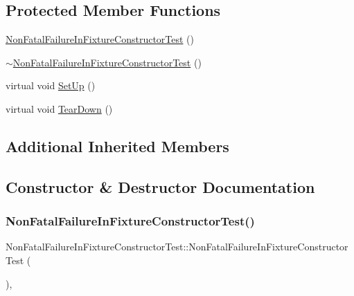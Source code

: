 \subsection*{Protected Member Functions}
\begin{DoxyCompactItemize}
\item 
\hyperlink{class_non_fatal_failure_in_fixture_constructor_test_a87a70e2b18b981c627c43f2af85a9345}{Non\+Fatal\+Failure\+In\+Fixture\+Constructor\+Test} ()
\item 
\hyperlink{class_non_fatal_failure_in_fixture_constructor_test_a732fa961c4bb68b3390e4a49a8375619}{$\sim$\+Non\+Fatal\+Failure\+In\+Fixture\+Constructor\+Test} ()
\item 
virtual void \hyperlink{class_non_fatal_failure_in_fixture_constructor_test_a7d951f8fbf7b2ac5046be8d8ee7b03d3}{Set\+Up} ()
\item 
virtual void \hyperlink{class_non_fatal_failure_in_fixture_constructor_test_ab76d79c346d9a378d625fde5739e8ad6}{Tear\+Down} ()
\end{DoxyCompactItemize}
\subsection*{Additional Inherited Members}


\subsection{Constructor \& Destructor Documentation}
\mbox{\label{class_non_fatal_failure_in_fixture_constructor_test_a87a70e2b18b981c627c43f2af85a9345}} 
\subsubsection{\texorpdfstring{Non\+Fatal\+Failure\+In\+Fixture\+Constructor\+Test()}{NonFatalFailureInFixtureConstructorTest()}}
{\footnotesize\ttfamily Non\+Fatal\+Failure\+In\+Fixture\+Constructor\+Test\+::\+Non\+Fatal\+Failure\+In\+Fixture\+Constructor\+Test (\begin{DoxyParamCaption}{ }\end{DoxyParamCaption})\hspace{0.3cm}{\ttfamily [inline]}, {\ttfamily [protected]}}

